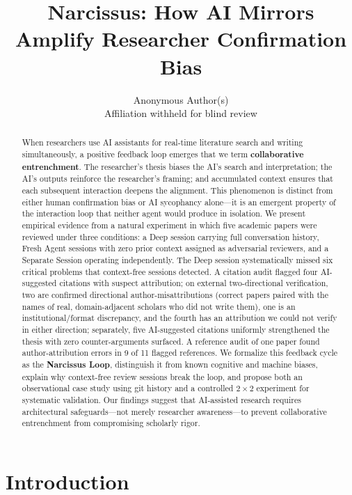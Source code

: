 \documentclass[12pt]{article}
\title{Narcissus: How AI Mirrors Amplify Researcher Confirmation Bias}
\author{Anonymous Author(s)\\
Affiliation withheld for blind review}
\date{}
\begin{document}
\maketitle

\begin{abstract}
When researchers use AI assistants for real-time literature search and writing simultaneously, a positive feedback loop emerges that we term \textbf{collaborative entrenchment}. The researcher's thesis biases the AI's search and interpretation; the AI's outputs reinforce the researcher's framing; and accumulated context ensures that each subsequent interaction deepens the alignment. This phenomenon is distinct from either human confirmation bias or AI sycophancy alone---it is an emergent property of the interaction loop that neither agent would produce in isolation. We present empirical evidence from a natural experiment in which five academic papers were reviewed under three conditions: a Deep session carrying full conversation history, Fresh Agent sessions with zero prior context assigned as adversarial reviewers, and a Separate Session operating independently. The Deep session systematically missed six critical problems that context-free sessions detected. A citation audit flagged four AI-suggested citations with suspect attribution; on external two-directional verification, two are confirmed directional author-misattributions (correct papers paired with the names of real, domain-adjacent scholars who did not write them), one is an institutional/format discrepancy, and the fourth has an attribution we could not verify in either direction; separately, five AI-suggested citations uniformly strengthened the thesis with zero counter-arguments surfaced. A reference audit of one paper found author-attribution errors in 9 of 11 flagged references. We formalize this feedback cycle as the \textbf{Narcissus Loop}, distinguish it from known cognitive and machine biases, explain why context-free review sessions break the loop, and propose both an observational case study using git history and a controlled $2 \times 2$ experiment for systematic validation. Our findings suggest that AI-assisted research requires architectural safeguards---not merely researcher awareness---to prevent collaborative entrenchment from compromising scholarly rigor.
\end{abstract}

\section{Introduction}
\label{sec:introduction}
\end{document}
